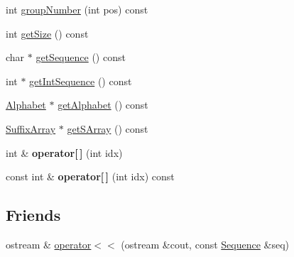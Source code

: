 \begin{DoxyCompactItemize}
\item 
int \hyperlink{classSequence_af6bfa15998fba32a84eab8e0d969e7a1}{group\-Number} (int pos) const 
\item 
int \hyperlink{classSequence_a3ac0084617a2aee42b1514ae643cae55}{get\-Size} () const 
\item 
char $\ast$ \hyperlink{classSequence_abeffc3c8063c2053f558c91bd6c6ab03}{get\-Sequence} () const 
\item 
int $\ast$ \hyperlink{classSequence_a8494195fe7abb033a9aab325940117ad}{get\-Int\-Sequence} () const 
\item 
\hyperlink{classAlphabet}{Alphabet} $\ast$ \hyperlink{classSequence_a376651dcee5501a5f9f3a76020ffc463}{get\-Alphabet} () const 
\item 
\hyperlink{classSuffixArray}{Suffix\-Array} $\ast$ \hyperlink{classSequence_a4e964c20776c22b32d9e6ff88e6a4454}{get\-S\-Array} () const 
\item 
\hypertarget{classSequence_a72e78f8764e7f8774c45d137839eafc9}{int \& {\bfseries operator\mbox{[}$\,$\mbox{]}} (int idx)}\label{classSequence_a72e78f8764e7f8774c45d137839eafc9}

\item 
\hypertarget{classSequence_a307cc3236cd04a8669124763dd536c06}{const int \& {\bfseries operator\mbox{[}$\,$\mbox{]}} (int idx) const }\label{classSequence_a307cc3236cd04a8669124763dd536c06}

\end{DoxyCompactItemize}
\subsection*{Friends}
\begin{DoxyCompactItemize}
\item 
ostream \& \hyperlink{classSequence_a722cf4445d8ab47d57bb361498cee55d}{operator$<$$<$} (ostream \&cout, const \hyperlink{classSequence}{Sequence} \&seq)
\end{DoxyCompactItemize}


